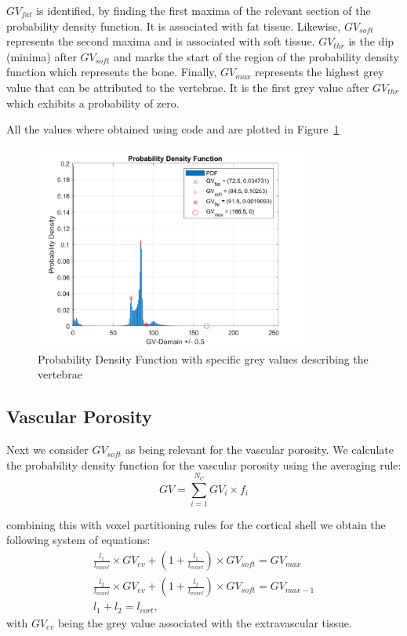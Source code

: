 \documentclass[a4paper,12pt]{article}
\begin{document}
    \vspace{10pt}
    $GV_{fat}$ is identified, by finding the first maxima of the relevant section of the probability density function.
    It is associated with fat tissue.
    Likewise, $GV_{soft}$ represents the second maxima and is associated with soft tissue.
    $GV_{thr}$ is the dip (minima) after $GV_{soft}$ and marks the start of the region of the probability density function which represents the bone.
    Finally, $GV_{max}$ represents the highest grey value that can be attributed to the vertebrae.
    It is the first grey value after $GV_{thr}$ which exhibits a probability of zero.

    \vspace{10pt}
    All the values where obtained using code and are plotted in Figure~\ref{fig:PD_with_special_points}
    \begin{figure}[h]
        \centering
        \includegraphics[width=0.8\textwidth]{PD_with_special_points}
        \caption{Probability Density Function with specific grey values describing the vertebrae}
        \label{fig:PD_with_special_points}
    \end{figure}

    \subsection{Vascular Porosity}\label{subsec:vascular-porosity}
    Next we consider $GV_{soft}$ as being relevant for the vascular porosity.
    We calculate the probability density function for the vascular porosity using the averaging rule:
    \[
        GV = \sum_{i=1}^{N_C} GV_i \times f_i
    \]

    combining this with voxel partitioning rules for the cortical shell we obtain the following system of equations:
    \begin{gather*}
        \frac{{l_1}}{{l_{voxel}}} \times GV_{ev} + \left(1 + \frac{{l_1}}{{l_{voxel}}}\right) \times GV_{soft} = GV_{max}\\
        \frac{{l_2}}{{l_{voxel}}} \times GV_{ev} + \left(1 + \frac{{l_2}}{{l_{voxel}}}\right) \times GV_{soft} = GV_{max-1}\\
        l_1 + l_2 = l_{cort},
    \end{gather*}
    with $GV_{ev}$ being the grey value associated with the extravascular tissue. \cite{blanchard2016patient}
\end{document}
